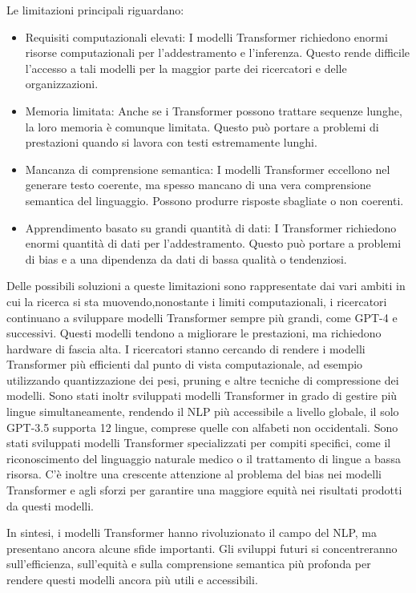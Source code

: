 Le limitazioni principali riguardano:
\begin{itemize}
    \item Requisiti computazionali elevati: I modelli Transformer richiedono enormi risorse computazionali per l'addestramento e l'inferenza. Questo rende difficile l'accesso a tali modelli per la maggior parte dei ricercatori e delle organizzazioni.
    \item Memoria limitata: Anche se i Transformer possono trattare sequenze lunghe, la loro memoria è comunque limitata. Questo può portare a problemi di prestazioni quando si lavora con testi estremamente lunghi.
    \item Mancanza di comprensione semantica: I modelli Transformer eccellono nel generare testo coerente, ma spesso mancano di una vera comprensione semantica del linguaggio. Possono produrre risposte sbagliate o non coerenti.
    \item Apprendimento basato su grandi quantità di dati: I Transformer richiedono enormi quantità di dati per l'addestramento. Questo può portare a problemi di bias e a una dipendenza da dati di bassa qualità o tendenziosi.
\end{itemize}

Delle possibili soluzioni a queste limitazioni sono rappresentate dai vari ambiti in cui la ricerca si sta muovendo,nonostante i limiti computazionali, i ricercatori continuano a sviluppare modelli Transformer sempre più grandi, come GPT-4 e successivi. Questi modelli tendono a migliorare le prestazioni, ma richiedono hardware di fascia alta.
I ricercatori stanno cercando di rendere i modelli Transformer più efficienti dal punto di vista computazionale, ad esempio utilizzando quantizzazione dei pesi, pruning e altre tecniche di compressione dei modelli.
Sono stati inoltr sviluppati modelli Transformer in grado di gestire più lingue simultaneamente, rendendo il NLP più accessibile a livello globale, il solo GPT-3.5 supporta 12 lingue, comprese quelle con alfabeti non occidentali.
Sono stati sviluppati modelli Transformer specializzati per compiti specifici, come il riconoscimento del linguaggio naturale medico o il trattamento di lingue a bassa risorsa.
C'è inoltre una crescente attenzione al problema del bias nei modelli Transformer e agli sforzi per garantire una maggiore equità nei risultati prodotti da questi modelli.

In sintesi, i modelli Transformer hanno rivoluzionato il campo del NLP, ma presentano ancora alcune sfide importanti. Gli sviluppi futuri si concentreranno sull'efficienza, sull'equità e sulla comprensione semantica più profonda per rendere questi modelli ancora più utili e accessibili.